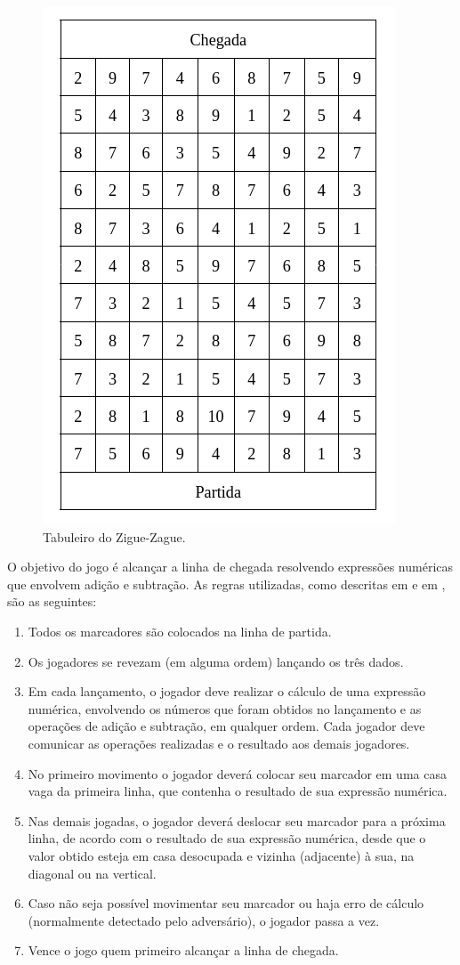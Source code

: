 \documentclass[12pt]{article}
\begin{document}
\begin{figure}[ht!]
	\centering
	\includegraphics[width=0.4\linewidth]{img/tabuleiro}
	\caption{Tabuleiro do Zigue-Zague.}
	\label{tabuleiro-zigue-zague}
\end{figure}

O objetivo do jogo é alcançar a linha de chegada resolvendo expressões numéricas que envolvem adição e subtração. As regras utilizadas, como descritas em \cite{silvakodama:2007} e em \cite{unesp:2022}, são as seguintes:

\begin{enumerate}
	\item Todos os marcadores são colocados na linha de partida.
	\item Os jogadores se revezam (em alguma ordem) lançando os três dados.
	\item Em cada lançamento, o jogador deve realizar o cálculo de uma expressão numérica, envolvendo os números que foram obtidos no lançamento e as operações de adição e subtração, em qualquer ordem. Cada jogador deve comunicar as operações realizadas e o resultado aos demais jogadores.
	\item No primeiro movimento o jogador deverá colocar seu marcador em uma casa vaga da primeira linha, que contenha o resultado de sua expressão numérica.
	\item Nas demais jogadas, o jogador deverá deslocar seu marcador para a próxima linha, de acordo com o resultado de sua expressão numérica, desde que o valor obtido esteja em casa desocupada e vizinha (adjacente) à sua, na diagonal ou na vertical.
	\item Caso não seja possível movimentar seu marcador ou haja erro de cálculo (normalmente detectado pelo adversário), o jogador passa a vez.
	\item Vence o jogo quem primeiro alcançar a linha de chegada.
\end{enumerate}
\end{document}

